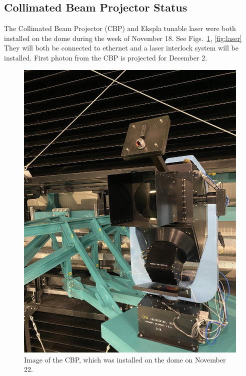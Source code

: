 \subsection{Collimated Beam Projector Status}

The Collimated Beam Projector (CBP) and Ekspla tunable laser were both installed on the dome during the week
of November 18. See Figs.~\ref{fig:cbp_2}, \ref{fig:laser} They will both be connected to ethernet and a laser interlock system will be installed. First photon from the CBP is projected for December 2.

  
\begin{figure}[htbp]
  \begin{center}
    \includegraphics[height=0.6\textheight]{throughput_for_focused_light_figures/cbp_on_dome_2}
  \end{center}
  \caption{Image of the CBP, which was installed on the dome on November 22.}
  \label{fig:cbp_2}
\end{figure}
  
